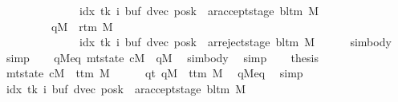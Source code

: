 \begin{isabellebody}
\ \ \ \ \ \ \ \ \ \ \ \ \ {\isasymand}\ {\isacharparenleft}{\kern0pt}idx{\isacharcomma}{\kern0pt}\ tk{\isacharcomma}{\kern0pt}\ i{\isacharcomma}{\kern0pt}\ buf{\isacharcomma}{\kern0pt}\ dvec{\isacharcomma}{\kern0pt}\ posk{\isacharparenright}{\kern0pt}\ {\isacharequal}{\kern0pt}\ ar{\isacharunderscore}{\kern0pt}accept{\isacharunderscore}{\kern0pt}stage\ {\isacharparenleft}{\kern0pt}bl{\isacharunderscore}{\kern0pt}tm\ M{\isacharparenright}{\kern0pt}{\isacharparenright}{\kern0pt}\isanewline
\ \ \ \ \ \ \ \ {\isasymor}\ {\isacharparenleft}{\kern0pt}qM{\isacharprime}{\kern0pt}\ {\isacharequal}{\kern0pt}\ r{\isacharunderscore}{\kern0pt}tm\ M\isanewline
\ \ \ \ \ \ \ \ \ \ \ \ \ {\isasymand}\ {\isacharparenleft}{\kern0pt}idx{\isacharcomma}{\kern0pt}\ tk{\isacharcomma}{\kern0pt}\ i{\isacharcomma}{\kern0pt}\ buf{\isacharcomma}{\kern0pt}\ dvec{\isacharcomma}{\kern0pt}\ posk{\isacharparenright}{\kern0pt}\ {\isacharequal}{\kern0pt}\ ar{\isacharunderscore}{\kern0pt}reject{\isacharunderscore}{\kern0pt}stage\ {\isacharparenleft}{\kern0pt}bl{\isacharunderscore}{\kern0pt}tm\ M{\isacharparenright}{\kern0pt}{\isacharparenright}{\kern0pt}{\isachardoublequoteclose}\isanewline
\ \ \ \ \isamarkupfalse%
\ sim{\isacharunderscore}{\kern0pt}body\ \isamarkupfalse%
\ simp\isanewline
\ \ \isamarkupfalse%
\ qM{\isacharunderscore}{\kern0pt}eq{\isacharcolon}{\kern0pt}\ {\isachardoublequoteopen}mt{\isacharunderscore}{\kern0pt}state\ cM\ {\isacharequal}{\kern0pt}\ qM{\isacharprime}{\kern0pt}{\isachardoublequoteclose}\ \isamarkupfalse%
\ sim{\isacharunderscore}{\kern0pt}body\ \isamarkupfalse%
\ simp\isanewline
\ \ \isamarkupfalse%
\ {\isacharquery}{\kern0pt}thesis\isanewline
\ \ \isamarkupfalse%
\isanewline
\ \ \ \ \isamarkupfalse%
\ {\isachardoublequoteopen}mt{\isacharunderscore}{\kern0pt}state\ cM\ {\isacharequal}{\kern0pt}\ t{\isacharunderscore}{\kern0pt}tm\ M{\isachardoublequoteclose}\isanewline
\ \ \ \ \isamarkupfalse%
\ qt{\isacharcolon}{\kern0pt}\ {\isachardoublequoteopen}qM{\isacharprime}{\kern0pt}\ {\isacharequal}{\kern0pt}\ t{\isacharunderscore}{\kern0pt}tm\ M{\isachardoublequoteclose}\ \isamarkupfalse%
\ qM{\isacharunderscore}{\kern0pt}eq\ \isamarkupfalse%
\ simp\isanewline
\ \ \ \ \isamarkupfalse%
\ {\isachardoublequoteopen}{\isacharparenleft}{\kern0pt}idx{\isacharcomma}{\kern0pt}\ tk{\isacharcomma}{\kern0pt}\ i{\isacharcomma}{\kern0pt}\ buf{\isacharcomma}{\kern0pt}\ dvec{\isacharcomma}{\kern0pt}\ posk{\isacharparenright}{\kern0pt}\ {\isacharequal}{\kern0pt}\ ar{\isacharunderscore}{\kern0pt}accept{\isacharunderscore}{\kern0pt}stage\ {\isacharparenleft}{\kern0pt}bl{\isacharunderscore}{\kern0pt}tm\ M{\isacharparenright}{\kern0pt}{\isachardoublequoteclose}\isanewline

\end{isabellebody}

